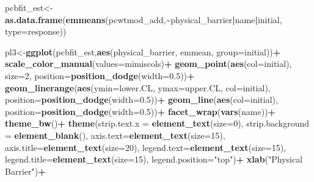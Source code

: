 \documentclass[
]{article}
\newenvironment{Shaded}{\begin{snugshade}}{\end{snugshade}}
\newcommand{\AttributeTok}[1]{\textcolor[rgb]{0.13,0.29,0.53}{#1}}
\newcommand{\DecValTok}[1]{\textcolor[rgb]{0.00,0.00,0.81}{#1}}
\newcommand{\FloatTok}[1]{\textcolor[rgb]{0.00,0.00,0.81}{#1}}
\newcommand{\FunctionTok}[1]{\textcolor[rgb]{0.13,0.29,0.53}{\textbf{#1}}}
\newcommand{\NormalTok}[1]{#1}
\newcommand{\OtherTok}[1]{\textcolor[rgb]{0.56,0.35,0.01}{#1}}
\newcommand{\SpecialCharTok}[1]{\textcolor[rgb]{0.81,0.36,0.00}{\textbf{#1}}}
\newcommand{\StringTok}[1]{\textcolor[rgb]{0.31,0.60,0.02}{#1}}
\begin{document}
\begin{Shaded}
\begin{Highlighting}[]
\NormalTok{pcbfit\_est}\OtherTok{\textless{}{-}}\FunctionTok{as.data.frame}\NormalTok{(}\FunctionTok{emmeans}\NormalTok{(pcwtmod\_add,}\SpecialCharTok{\textasciitilde{}}\NormalTok{physical\_barrier}\SpecialCharTok{|}\NormalTok{name}\SpecialCharTok{|}\NormalTok{initial, }\AttributeTok{type=}\StringTok{\textquotesingle{}response\textquotesingle{}}\NormalTok{))}


\NormalTok{pl3}\OtherTok{\textless{}{-}}\FunctionTok{ggplot}\NormalTok{(pcbfit\_est,}\FunctionTok{aes}\NormalTok{(physical\_barrier, emmean, }\AttributeTok{group=}\NormalTok{initial))}\SpecialCharTok{+}
  \FunctionTok{scale\_color\_manual}\NormalTok{(}\AttributeTok{values=}\NormalTok{mimiscols)}\SpecialCharTok{+}
  \FunctionTok{geom\_point}\NormalTok{(}\FunctionTok{aes}\NormalTok{(}\AttributeTok{col=}\NormalTok{initial), }\AttributeTok{size=}\DecValTok{2}\NormalTok{, }\AttributeTok{position=}\FunctionTok{position\_dodge}\NormalTok{(}\AttributeTok{width=}\FloatTok{0.5}\NormalTok{))}\SpecialCharTok{+}
  \FunctionTok{geom\_linerange}\NormalTok{(}\FunctionTok{aes}\NormalTok{(}\AttributeTok{ymin=}\NormalTok{lower.CL, }\AttributeTok{ymax=}\NormalTok{upper.CL, }\AttributeTok{col=}\NormalTok{initial), }\AttributeTok{position=}\FunctionTok{position\_dodge}\NormalTok{(}\AttributeTok{width=}\FloatTok{0.5}\NormalTok{))}\SpecialCharTok{+}
  \FunctionTok{geom\_line}\NormalTok{(}\FunctionTok{aes}\NormalTok{(}\AttributeTok{col=}\NormalTok{initial), }\AttributeTok{position=}\FunctionTok{position\_dodge}\NormalTok{(}\AttributeTok{width=}\FloatTok{0.5}\NormalTok{))}\SpecialCharTok{+}
  \FunctionTok{facet\_wrap}\NormalTok{(}\FunctionTok{vars}\NormalTok{(name))}\SpecialCharTok{+}
  \FunctionTok{theme\_bw}\NormalTok{()}\SpecialCharTok{+}
  \FunctionTok{theme}\NormalTok{(}\AttributeTok{strip.text.x =} \FunctionTok{element\_text}\NormalTok{(}\AttributeTok{size=}\DecValTok{0}\NormalTok{),}
        \AttributeTok{strip.background =} \FunctionTok{element\_blank}\NormalTok{(),}
        \AttributeTok{axis.text=}\FunctionTok{element\_text}\NormalTok{(}\AttributeTok{size=}\DecValTok{15}\NormalTok{),}
        \AttributeTok{axis.title=}\FunctionTok{element\_text}\NormalTok{(}\AttributeTok{size=}\DecValTok{20}\NormalTok{),}
        \AttributeTok{legend.text=}\FunctionTok{element\_text}\NormalTok{(}\AttributeTok{size=}\DecValTok{15}\NormalTok{),}
        \AttributeTok{legend.title=}\FunctionTok{element\_text}\NormalTok{(}\AttributeTok{size=}\DecValTok{15}\NormalTok{),}
        \AttributeTok{legend.position=}\StringTok{"top"}\NormalTok{)}\SpecialCharTok{+}
  \FunctionTok{xlab}\NormalTok{(}\StringTok{"Physical Barrier"}\NormalTok{)}\SpecialCharTok{+}

\end{Highlighting}
\end{Shaded}
\end{document}
